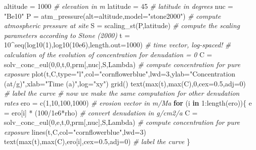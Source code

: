 \documentclass[
]{book}
\newenvironment{Shaded}{\begin{snugshade}}{\end{snugshade}}
\newcommand{\AttributeTok}[1]{\textcolor[rgb]{0.77,0.63,0.00}{#1}}
\newcommand{\CommentTok}[1]{\textcolor[rgb]{0.56,0.35,0.01}{\textit{#1}}}
\newcommand{\ControlFlowTok}[1]{\textcolor[rgb]{0.13,0.29,0.53}{\textbf{#1}}}
\newcommand{\DecValTok}[1]{\textcolor[rgb]{0.00,0.00,0.81}{#1}}
\newcommand{\FloatTok}[1]{\textcolor[rgb]{0.00,0.00,0.81}{#1}}
\newcommand{\FunctionTok}[1]{\textcolor[rgb]{0.00,0.00,0.00}{#1}}
\newcommand{\NormalTok}[1]{#1}
\newcommand{\OtherTok}[1]{\textcolor[rgb]{0.56,0.35,0.01}{#1}}
\newcommand{\SpecialCharTok}[1]{\textcolor[rgb]{0.00,0.00,0.00}{#1}}
\newcommand{\StringTok}[1]{\textcolor[rgb]{0.31,0.60,0.02}{#1}}
\begin{document}
\begin{Shaded}
\begin{Highlighting}[]
\NormalTok{altitude }\OtherTok{=} \DecValTok{1000} \CommentTok{\# elevation in m}
\NormalTok{latitude }\OtherTok{=} \DecValTok{45} \CommentTok{\# latitude in degrees}
\NormalTok{nuc }\OtherTok{=} \StringTok{"Be10"}
\NormalTok{P }\OtherTok{=} \FunctionTok{atm\_pressure}\NormalTok{(}\AttributeTok{alt=}\NormalTok{altitude,}\AttributeTok{model=}\StringTok{"stone2000"}\NormalTok{) }\CommentTok{\# compute atmospheric pressure at site}
\NormalTok{S }\OtherTok{=} \FunctionTok{scaling\_st}\NormalTok{(P,latitude) }\CommentTok{\# compute the scaling parameters according to Stone (2000)}
\NormalTok{t }\OtherTok{=}  \DecValTok{10}\SpecialCharTok{\^{}}\FunctionTok{seq}\NormalTok{(}\FunctionTok{log10}\NormalTok{(}\DecValTok{1}\NormalTok{),}\FunctionTok{log10}\NormalTok{(}\FloatTok{10e6}\NormalTok{),}\AttributeTok{length.out=}\DecValTok{1000}\NormalTok{) }\CommentTok{\# time vector, log{-}spaced!}
\CommentTok{\# calculation of the evolution of concentration for denudation = 0}
\NormalTok{C }\OtherTok{=} \FunctionTok{solv\_conc\_eul}\NormalTok{(}\DecValTok{0}\NormalTok{,}\DecValTok{0}\NormalTok{,t,}\DecValTok{0}\NormalTok{,prm[,nuc],S,Lambda) }\CommentTok{\# compute concentration for pure exposure}
\FunctionTok{plot}\NormalTok{(t,C,}\AttributeTok{type=}\StringTok{"l"}\NormalTok{,}\AttributeTok{col=}\StringTok{"cornflowerblue"}\NormalTok{,}\AttributeTok{lwd=}\DecValTok{3}\NormalTok{,}\AttributeTok{ylab=}\StringTok{"Concentration (at/g)"}\NormalTok{,}\AttributeTok{xlab=}\StringTok{"Time (a)"}\NormalTok{,}\AttributeTok{log=}\StringTok{"xy"}\NormalTok{)}
\FunctionTok{grid}\NormalTok{()}
\FunctionTok{text}\NormalTok{(}\FunctionTok{max}\NormalTok{(t),}\FunctionTok{max}\NormalTok{(C),}\DecValTok{0}\NormalTok{,}\AttributeTok{cex=}\FloatTok{0.5}\NormalTok{,}\AttributeTok{adj=}\DecValTok{0}\NormalTok{) }\CommentTok{\# label the curve}
\CommentTok{\# now we make the same computation for other denudation rates}
\NormalTok{ero }\OtherTok{=} \FunctionTok{c}\NormalTok{(}\DecValTok{1}\NormalTok{,}\DecValTok{10}\NormalTok{,}\DecValTok{100}\NormalTok{,}\DecValTok{1000}\NormalTok{) }\CommentTok{\# erosion vector in m/Ma}
\ControlFlowTok{for}\NormalTok{ (i }\ControlFlowTok{in} \DecValTok{1}\SpecialCharTok{:}\FunctionTok{length}\NormalTok{(ero))\{}
\NormalTok{  e }\OtherTok{=}\NormalTok{ ero[i] }\SpecialCharTok{*}\NormalTok{ (}\DecValTok{100}\SpecialCharTok{/}\FloatTok{1e6}\SpecialCharTok{*}\NormalTok{rho) }\CommentTok{\# convert denudation in g/cm2/a}
\NormalTok{  C }\OtherTok{=} \FunctionTok{solv\_conc\_eul}\NormalTok{(}\DecValTok{0}\NormalTok{,e,t,}\DecValTok{0}\NormalTok{,prm[,nuc],S,Lambda) }\CommentTok{\# compute concentration for pure exposure}
  \FunctionTok{lines}\NormalTok{(t,C,}\AttributeTok{col=}\StringTok{"cornflowerblue"}\NormalTok{,}\AttributeTok{lwd=}\DecValTok{3}\NormalTok{)}
  \FunctionTok{text}\NormalTok{(}\FunctionTok{max}\NormalTok{(t),}\FunctionTok{max}\NormalTok{(C),ero[i],}\AttributeTok{cex=}\FloatTok{0.5}\NormalTok{,}\AttributeTok{adj=}\DecValTok{0}\NormalTok{) }\CommentTok{\# label the curve}
\NormalTok{\}}
\end{Highlighting}
\end{Shaded}
\end{document}
